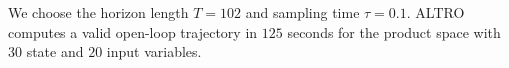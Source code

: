 We choose the horizon length $T=102$ and sampling time $\tau=0.1$. ALTRO computes a valid open-loop trajectory %
in $125$ seconds for the product space with $30$ state and $20$ input variables.  %

 
